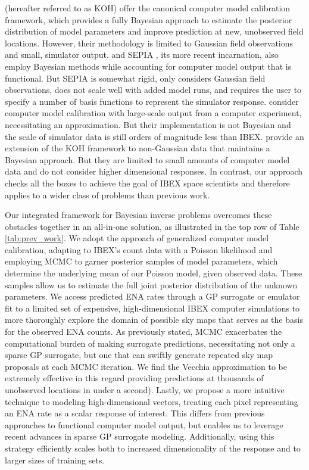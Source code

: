 \documentclass[11pt]{article}
\begin{document}
\citet{kennedyohagan2001} (hereafter referred to as KOH) offer the canonical
computer model calibration framework, which provides a fully Bayesian
approach to estimate the posterior distribution of model parameters and
improve prediction at new, unobserved field locations. However, their
methodology is limited to Gaussian field observations and small, simulator
output. \citet{higdoncalib2008} and SEPIA \citep{gattiker2020lanl}, its more
recent incarnation, also employ Bayesian methods while accounting for
computer model output that is functional. But SEPIA is somewhat rigid, only
considers Gaussian field observations, does not scale well with added model
runs, and requires the user to specify a number of basis functions to
represent the simulator response. \citet{gramacy2015calibrating} consider
computer model calibration with large-scale output from a computer
experiment, necessitating an approximation. But their implementation is not
Bayesian and the scale of simulator data is still orders of magnitude less
than IBEX. \citet{grosskopfcountcalib2020} provide an extension of the KOH
framework to non-Gaussian data that maintains a Bayesian approach. But they
are limited to small amounts of computer model data and do not consider
higher dimensional responses. In contrast, our approach checks all the boxes
to achieve the goal of IBEX space scientists and therefore applies to a
wider class of problems than previous work.

Our integrated framework for Bayesian inverse problems overcomes these
obstacles together in an all-in-one solution, as illustrated in the top row of
Table \ref{tab:prev_work}. We adopt the approach of generalized computer model
calibration, adapting to IBEX's count data with a Poisson likelihood and
employing MCMC to garner posterior samples of model parameters, which
determine the underlying mean of our Poisson model, given observed data. These
samples allow us to estimate the full joint posterior distribution of the
unknown parameters. We access predicted ENA rates through a GP surrogate or
emulator fit to a limited set of expensive, high-dimensional IBEX computer
simulations to more thoroughly explore the domain of possible sky maps that
serves as the basis for the observed ENA counts. As previously stated, MCMC
exacerbates the computational burden of making surrogate predictions,
necessitating not only a sparse GP surrogate, but one that can swiftly
generate repeated sky map proposals at each MCMC iteration. We find the
Vecchia approximation to be extremely effective in this regard {\color{red}
providing predictions at thousands of unobserved locations in under a
second)}. Lastly, we propose a more intuitive technique to modeling
high-dimensional vectors, treating each pixel representing an ENA rate as a
scalar response of interest. This differs from previous approaches to
functional computer model output, but enables us to leverage recent advances
in sparse GP surrogate modeling. Additionally, using this strategy efficiently
scales both to increased dimensionality of the response and to larger sizes of
training sets.
\end{document}
